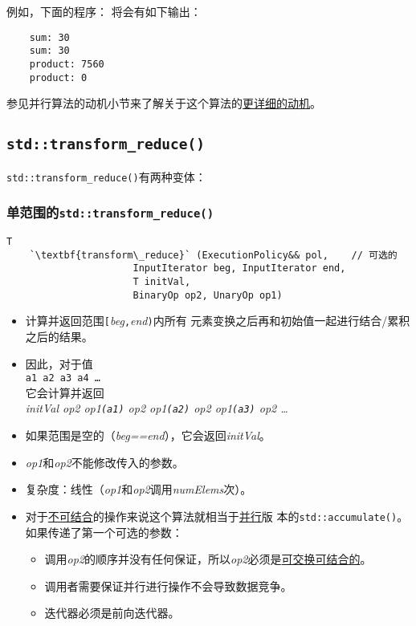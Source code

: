 例如，下面的程序：
将会有如下输出：
\begin{lstlisting}
    sum: 30
    sum: 30
    product: 7560
    product: 0
\end{lstlisting}
参见并行算法的动机小节来了解关于这个算法的\hyperref[ch22.6.1]{更详细的动机}。

\subsection{\texttt{std::transform\_reduce()}}\label{ch23.2.2}
\texttt{std::transform\_reduce()}有两种变体：

\subsubsection{单范围的\texttt{std::transform\_reduce()}}
\begin{lstlisting}[frame=single,xleftmargin=13pt,xrightmargin=13pt]
    T
    `\textbf{transform\_reduce}` (ExecutionPolicy&& pol,    // 可选的
                      InputIterator beg, InputIterator end,
                      T initVal,
                      BinaryOp op2, UnaryOp op1)

\end{lstlisting}
\begin{itemize}
    \item 计算并返回范围\texttt{[}\emph{beg}\texttt{,}\emph{end}\texttt{)}内所有
    元素变换之后再和初始值一起进行结合/累积之后的结果。
    \item 因此，对于值\\
    \hspace*{2em}\texttt{a1 a2 a3 a4 \ldots}\\
    它会计算并返回\\
    \hspace*{2em}\emph{initVal op2 op1\texttt{(a1)} op2 op1\texttt{(a2)} op2 op1\texttt{(a3)} op2 \ldots}
    \item 如果范围是空的（\emph{beg==end}），它会返回\emph{initVal}。
    \item \emph{op1}和\emph{op2}不能修改传入的参数。
    \item 复杂度：线性（\emph{op1}和\emph{op2}调用\emph{numElems}次）。
    \item 对于\hyperref[ch22.6.1.3]{不可结合}的操作来说这个算法就相当于\hyperref[ch22]{并行}版
    本的\texttt{std::accumulate()}。如果传递了第一个可选的参数：
    \begin{itemize}
        \item 调用\emph{op2}的顺序并没有任何保证，所以\emph{op2}必须是\hyperref[ch22.6.1.1]{可交换可结合的}。
        \item 调用者需要保证并行进行操作不会导致数据竞争。
        \item 迭代器必须是前向迭代器。
    \end{itemize}
\end{itemize}
